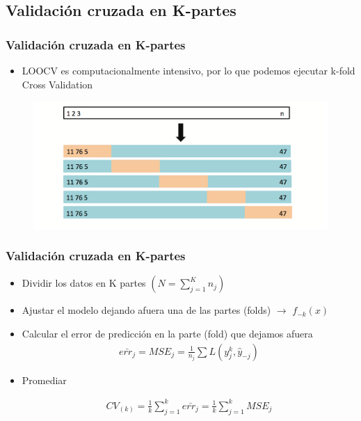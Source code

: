 \documentclass[
  shownotes,
  xcolor={svgnames},
  hyperref={colorlinks,citecolor=DarkBlue,linkcolor=DarkRed,urlcolor=DarkBlue}
  , aspectratio=169]{beamer}
\begin{document}
\subsection{Validación cruzada en K-partes}
\begin{frame}[fragile]
\frametitle{Validación cruzada en K-partes}
\begin{itemize}
\item LOOCV es computacionalmente intensivo, por lo que podemos ejecutar k-fold Cross Validation 
\end{itemize}


 \begin{figure}[H] \centering
            \captionsetup{justification=centering}
              \includegraphics[scale=0.5]{figures/fig55.png}
       \end{figure}



\end{frame}
\begin{frame}[fragile]
\frametitle{Validación cruzada en K-partes}

\begin{itemize}
  \item Dividir los datos en K partes $(N=\sum_{j=1}^K n_j)$
  \medskip
  \item Ajustar el modelo dejando afuera una de las partes (folds)  $\rightarrow$ $f_{-k}(x)$
  \medskip
  \item Calcular el error de predicción en la parte (fold) que dejamos afuera 
  \begin{align}
  \bar{err_j}=MSE_j=\frac{1}{n_j}\sum L(y_j^k,\hat y_{-j})
  \end{align}
  \medskip
\item Promediar

\begin{align}
CV_{(k)}=\frac{1}{k}\sum_{j=1}^k \bar{err_j}= \frac{1}{k}\sum_{j=1}^k MSE_j
\end{align}
\end{itemize}

\end{frame}
\end{document}
